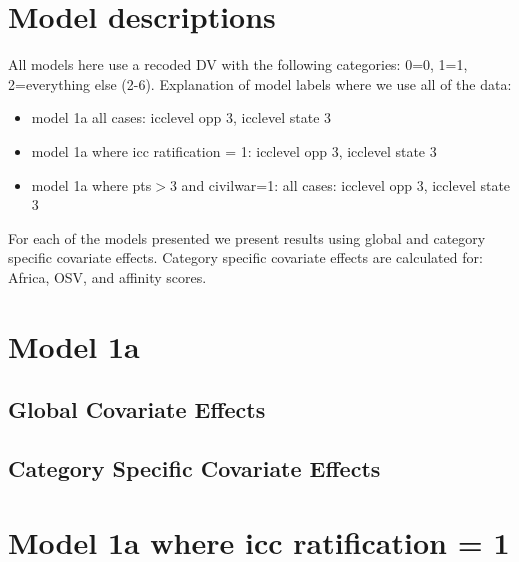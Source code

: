 \documentclass[]{article}
\begin{document}
\tableofcontents

\clearpage

\section{Model descriptions}

All models here use a recoded DV with the following categories: 0=0, 1=1, 2=everything else (2-6). Explanation of model labels where we use all of the data:

\begin{itemize}
	\item model 1a all cases: icclevel opp 3, icclevel state 3
	\item model 1a where icc ratification = 1: icclevel opp 3, icclevel state 3
	\item model 1a where pts$>$3 and civilwar=1: all cases: icclevel opp 3, icclevel state 3		
\end{itemize}

For each of the models presented we present results using global and category specific covariate effects. Category specific covariate effects are calculated for: Africa, OSV, and affinity scores.
\clearpage

\section{Model 1a}
\subsection{Global Covariate Effects}

\clearpage
\subsection{Category Specific Covariate Effects}

\clearpage

\section{Model 1a where icc ratification = 1}
\end{document}
